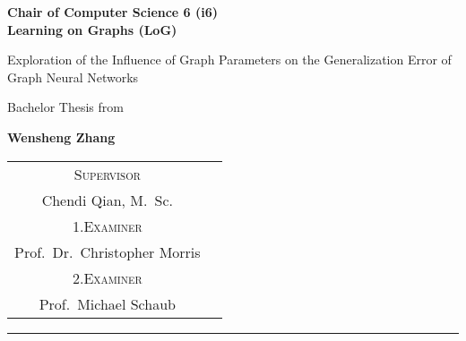 \begin{titlepage}
    \centering
    \begin{onehalfspace}
    	\begin{german}
        	\vspace{1.0cm}
        	\large {\bfseries Chair of Computer Science 6 (i6)\\Learning on Graphs (LoG)} \\

        	\vspace{2.5cm}

            \begin{doublespace}
            	\textenglish{\textsf{\Huge{Exploration of the Influence of Graph Parameters on the Generalization Error of Graph Neural Networks}}}
            \end{doublespace}

        	\vspace{2cm}

            \Large{Bachelor Thesis from}\\

        	\vspace{1cm}

        	{\bfseries \large{Wensheng Zhang}}

        	\vfill

        	{\large
        		\begin{tabular}[l]{cc}
                        \textsc{Supervisor}\\
        			Chendi Qian, M.~Sc. \\
        			\textsc{1.Examiner}\\
        			Prof.~Dr.~Christopher Morris \\
                        \textsc{2.Examiner}\\
        			Prof.~Michael Schaub
        		\end{tabular}
        	}

        	\vspace{1.5cm}

        	\parbox{\linewidth}{\hrule\strut}

            \vfill

	    \textgerman{\thedate}
    	\end{german}
    \end{onehalfspace}
\end{titlepage}

